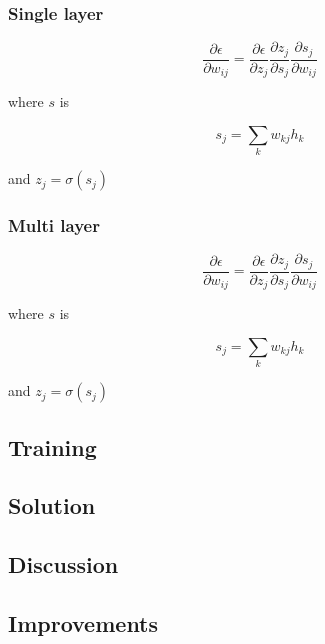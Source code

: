 \documentclass{IEEEtran}
\begin{document}
\subsubsection{Single layer}
\begin{equation}
  \frac{\partial \epsilon}{\partial w_{ij}} =
  \frac{\partial \epsilon}{\partial z_j}
  \frac{\partial z_j}{\partial s_j}
  \frac{\partial s_j}{\partial w_{ij}}
\end{equation}

where $s$ is

\begin{equation}
  s_j = \sum_{k}{w_{kj}h_k}
\end{equation}

and $z_j = \sigma(s_j)$

\subsubsection{Multi layer}
\begin{equation}
  \frac{\partial \epsilon}{\partial w_{ij}} =
  \frac{\partial \epsilon}{\partial z_j}
  \frac{\partial z_j}{\partial s_j}
  \frac{\partial s_j}{\partial w_{ij}}
\end{equation}

where $s$ is

\begin{equation}
  s_j = \sum_{k}{w_{kj}h_k}
\end{equation}

and $z_j = \sigma(s_j)$

\subsection{Training}

\subsection{Solution}

\subsection{Discussion}

\subsection{Improvements}
\end{document}
